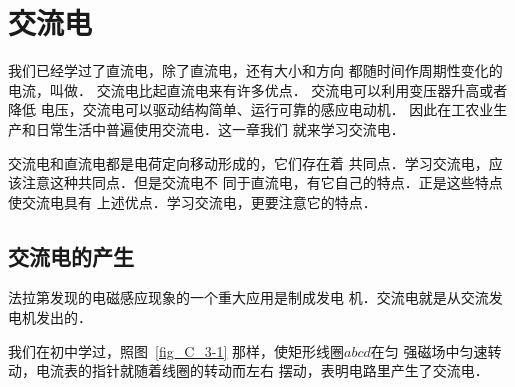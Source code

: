 \chapter{交流电}\label{chapter-alternating-current}

我们已经学过了直流电，除了直流电，还有大小和方向
都随时间作周期性变化的电流，叫做．
交流电比起直流电来有许多优点．
交流电可以利用变压器升高或者降低
电压，交流电可以驱动结构简单、运行可靠的感应电动机．
因此在工农业生产和日常生活中普遍使用交流电．这一章我们
就来学习交流电．

交流电和直流电都是电荷定向移动形成的，它们存在着
共同点．学习交流电，应该注意这种共同点．但是交流电不
同于直流电，有它自己的特点．正是这些特点使交流电具有
上述优点．学习交流电，更要注意它的特点．

\section{交流电的产生}


法拉第发现的电磁感应现象的一个重大应用是制成发电
机．交流电就是从交流发电机发出的．

我们在初中学过，照图~\ref{fig_C_3-1} 那样，使矩形线圈$abcd$在匀
强磁场中匀速转动，电流表的指针就随着线圈的转动而左右
摆动，表明电路里产生了交流电．

